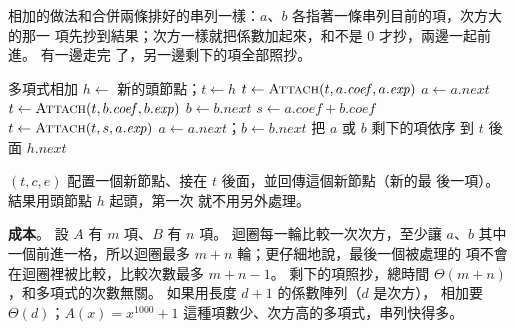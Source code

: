 相加的做法和合併兩條排好的串列一樣：$a$、$b$ 各指著一條串列目前的項，次方大的那一
項先抄到結果；次方一樣就把係數加起來，和不是 $0$ 才抄，兩邊一起前進。 有一邊走完
了，另一邊剩下的項全部照抄。

\begin{pseudo}[label=alg:ll-poly-add]{多項式相加}
 
    \State $h \gets$ 新的頭節點；$t \gets h$ 
            \State $t \gets \Call{Attach}{t, a.\mathit{coef}, a.\mathit{exp}}$
            \State $a \gets a.\mathit{next}$
            \State $t \gets \Call{Attach}{t, b.\mathit{coef}, b.\mathit{exp}}$
            \State $b \gets b.\mathit{next}$
        \Else
            \State $s \gets a.\mathit{coef} + b.\mathit{coef}$
                \State $t \gets \Call{Attach}{t, s, a.\mathit{exp}}$
            \EndIf
            \State $a \gets a.\mathit{next}$；$b \gets b.\mathit{next}$
        \EndIf
    \EndWhile
    \State 把 $a$ 或 $b$ 剩下的項依序  到 $t$ 後面
    \State \Return $h.\mathit{next}$
\EndFunction
\end{pseudo}

$(t, c, e)$ 配置一個新節點、接在 $t$ 後面，並回傳這個新節點（新的最
後一項）。 結果用頭節點 $h$ 起頭，第一次  就不用另外處理。

\textbf{成本}。 設 $A$ 有 $m$ 項、$B$ 有 $n$ 項。 迴圈每一輪比較一次次方，至少讓
$a$、$b$ 其中一個前進一格，所以迴圈最多 $m + n$ 輪；更仔細地說，最後一個被處理的
項不會在迴圈裡被比較，比較次數最多 $m + n - 1$。 剩下的項照抄，總時間
$\Theta(m + n)$，和多項式的次數無關。 如果用長度 $d + 1$ 的係數陣列（$d$ 是次方），
相加要 $\Theta(d)$；$A(x) = x^{1000} + 1$ 這種項數少、次方高的多項式，串列快得多。

